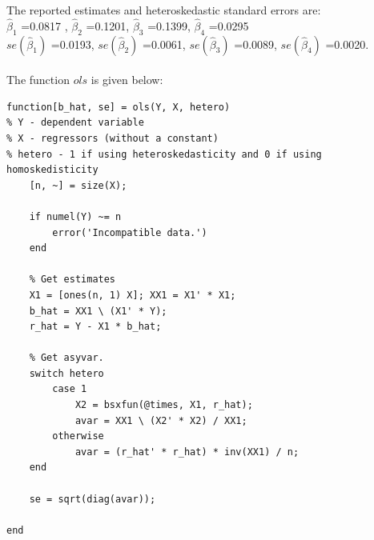 \documentclass[10pt]{article}
\begin{document}
The reported estimates and heteroskedastic standard errors are:\\
$\hat{\beta}_1$ =0.0817 , $\hat{\beta}_2$ =0.1201, $\hat{\beta}_3$ =0.1399, $\hat{\beta}_4$ =0.0295\\
$se(\hat{\beta}_1)$ =0.0193, $se(\hat{\beta}_2)$ =0.0061, $se(\hat{\beta}_3)$ =0.0089, $se(\hat{\beta}_4)$ =0.0020. \\\\
The function $ols$ is given below:
 \begin{lstlisting}
function[b_hat, se] = ols(Y, X, hetero)
% Y - dependent variable
% X - regressors (without a constant)
% hetero - 1 if using heteroskedasticity and 0 if using homoskedisticity
    [n, ~] = size(X);

    if numel(Y) ~= n
        error('Incompatible data.') 
    end
    
    % Get estimates
    X1 = [ones(n, 1) X]; XX1 = X1' * X1;
    b_hat = XX1 \ (X1' * Y);
    r_hat = Y - X1 * b_hat;
    
    % Get asyvar.
    switch hetero
        case 1
            X2 = bsxfun(@times, X1, r_hat);
            avar = XX1 \ (X2' * X2) / XX1;
        otherwise
            avar = (r_hat' * r_hat) * inv(XX1) / n; 
    end
 
    se = sqrt(diag(avar));
    
end
\end{lstlisting}
\end{document}
